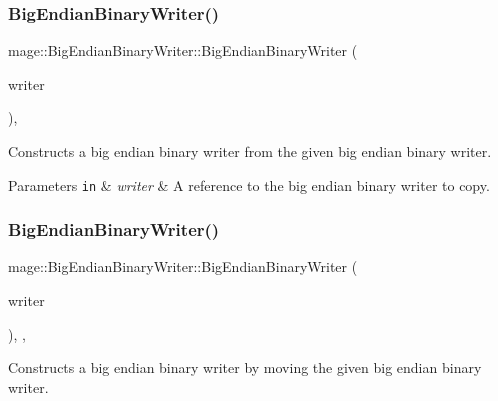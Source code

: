 \subsubsection{\texorpdfstring{Big\+Endian\+Binary\+Writer()}{BigEndianBinaryWriter()}\hspace{0.1cm}{\footnotesize\ttfamily [2/3]}}
{\footnotesize\ttfamily mage\+::\+Big\+Endian\+Binary\+Writer\+::\+Big\+Endian\+Binary\+Writer (\begin{DoxyParamCaption}\item[{const \hyperlink{classmage_1_1_big_endian_binary_writer}{Big\+Endian\+Binary\+Writer} \&}]{writer }\end{DoxyParamCaption})\hspace{0.3cm}{\ttfamily [protected]}, {\ttfamily [delete]}}

Constructs a big endian binary writer from the given big endian binary writer.


\begin{DoxyParams}[1]{Parameters}
\mbox{\tt in}  & {\em writer} & A reference to the big endian binary writer to copy. \\
\hline
\end{DoxyParams}
\hypertarget{classmage_1_1_big_endian_binary_writer_aaf2dcf536afefc7b0ca8b0752024311d}{}\label{classmage_1_1_big_endian_binary_writer_aaf2dcf536afefc7b0ca8b0752024311d} 
\subsubsection{\texorpdfstring{Big\+Endian\+Binary\+Writer()}{BigEndianBinaryWriter()}\hspace{0.1cm}{\footnotesize\ttfamily [3/3]}}
{\footnotesize\ttfamily mage\+::\+Big\+Endian\+Binary\+Writer\+::\+Big\+Endian\+Binary\+Writer (\begin{DoxyParamCaption}\item[{\hyperlink{classmage_1_1_big_endian_binary_writer}{Big\+Endian\+Binary\+Writer} \&\&}]{writer }\end{DoxyParamCaption})\hspace{0.3cm}{\ttfamily [protected]}, {\ttfamily [default]}, {\ttfamily [noexcept]}}

Constructs a big endian binary writer by moving the given big endian binary writer.


